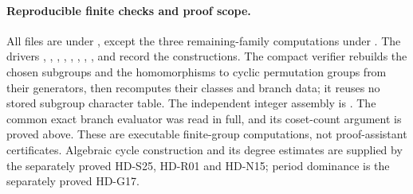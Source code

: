 \paragraph{Reproducible finite checks and proof scope.}
All files are under , except the
three remaining-family computations under .
The drivers ,
,
,
, ,
,
, , and
 record the constructions.
The compact verifier  rebuilds
the chosen subgroups and the homomorphisms to cyclic permutation groups
from their generators, then recomputes their classes and branch data;
it reuses no stored subgroup character table. The independent integer
assembly is .
The common exact branch evaluator was read in full, and its coset-count
argument is proved above. These are executable finite-group computations,
not proof-assistant certificates. Algebraic cycle construction and its
degree estimates are supplied by the separately proved HD-S25,
HD-R01 and HD-N15; period dominance is the separately proved HD-G17.
